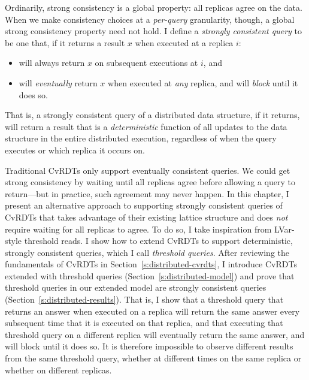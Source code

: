 Ordinarily, strong consistency is a global property: all replicas
agree on the data.  When we make consistency choices at a
\emph{per-query} granularity, though, a global strong consistency
property need not hold.  I define a \emph{strongly consistent query}
to be one that, if it returns a result $x$ when executed at a replica
$i$:
\begin{itemize}
  \item will always return $x$ on subsequent executions at $i$, and
  \item will \emph{eventually} return $x$ when executed at \emph{any}
    replica, and will \emph{block} until it does so.
\end{itemize}
That is, a strongly consistent query of a distributed data structure,
if it returns, will return a result that is a \emph{deterministic}
function of all updates to the data structure in the entire
distributed execution, regardless of when the query executes or which
replica it occurs on.

Traditional CvRDTs only support eventually consistent queries.  We
could get strong consistency by waiting until all replicas agree
before allowing a query to return---but in practice, such agreement
may never happen.  In this chapter, I present an alternative approach
to supporting strongly consistent queries of CvRDTs that takes
advantage of their existing lattice structure and does \emph{not}
require waiting for all replicas to agree.  To do so, I take
inspiration from LVar-style threshold reads.  I show how to extend
CvRDTs to support deterministic, strongly consistent queries, which I
call \emph{threshold queries}.  After reviewing the fundamentals of
CvRDTs in Section~\ref{s:distributed-cvrdts}, I introduce CvRDTs
extended with threshold queries (Section~\ref{s:distributed-model})
and prove that threshold queries in our extended model are strongly
consistent queries (Section~\ref{s:distributed-results}).  That is, I
show that a threshold query that returns an answer when executed on a
replica will return the same answer every subsequent time that it is
executed on that replica, and that executing that threshold query on a
different replica will eventually return the same answer, and will
block until it does so.  It is therefore impossible to observe
different results from the same threshold query, whether at different
times on the same replica or whether on different replicas.
